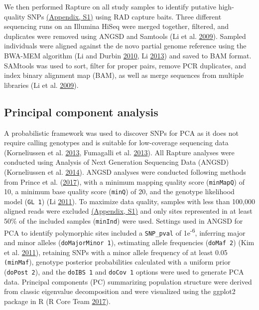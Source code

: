\documentclass[twoside,12pt,final]{ucthesis-CA2012} %
\begin{document}
\begin{ucmainmatter}
We then performed Rapture on all study samples to identify putative
high-quality SNPs \protect\hyperlink{supptables}{(Appendix, S1)} using
RAD capture baits. Three different sequencing runs on an Illumina HiSeq
were merged together, filtered, and duplicates were removed using ANGSD
and Samtools (Li et al. \protect\hyperlink{ref-li_sequence_2009}{2009}).
Sampled individuals were aligned against the de novo partial genome
reference using the BWA-MEM algorithm (Li and Durbin
\protect\hyperlink{ref-li_fast_2010}{2010}, Li
\protect\hyperlink{ref-li_aligning_2013}{2013}) and saved to BAM format.
SAMtools was used to sort, filter for proper pairs, remove PCR
duplicates, and index binary alignment map (BAM), as well as merge
sequences from multiple libraries (Li et al.
\protect\hyperlink{ref-li_sequence_2009}{2009}).

\hypertarget{principal-component-analysis}{%
\subsection{Principal component
analysis}\label{principal-component-analysis}}

A probabilistic framework was used to discover SNPs for PCA as it does
not require calling genotypes and is suitable for low-coverage
sequencing data (Korneliussen et al.
\protect\hyperlink{ref-korneliussen_calculation_2013}{2013}, Fumagalli
et al. \protect\hyperlink{ref-fumagalli_quantifying_2013}{2013}). All
Rapture analyses were conducted using Analysis of Next Generation
Sequencing Data (ANGSD) (Korneliussen et al.
\protect\hyperlink{ref-korneliussen_angsd_2014}{2014}). ANGSD analyses
were conducted following methods from Prince et al.
(\protect\hyperlink{ref-prince_evolutionary_2017}{2017}), with a minimum
mapping quality score (\texttt{minMapQ}) of 10, a minimum base quality
score (\texttt{minQ}) of 20, and the genotype likelihood model
(\texttt{GL\ 1}) (Li \protect\hyperlink{ref-li_statistical_2011}{2011}).
To maximize data quality, samples with less than 100,000 aligned reads
were excluded \protect\hyperlink{supptables}{(Appendix, S1)} and only
sites represented in at least 50\% of the included samples
(\texttt{minInd}) were used. Settings used in ANGSD for PCA to identify
polymorphic sites included a \texttt{SNP\_pval} of
1e\textsuperscript{-6}, inferring major and minor alleles
(\texttt{doMajorMinor\ 1}), estimating allele frequencies
(\texttt{doMaf\ 2}) (Kim et al.
\protect\hyperlink{ref-kim_estimation_2011}{2011}), retaining SNPs with
a minor allele frequency of at least 0.05 \texttt{(minMaf}), genotype
posterior probabilities calculated with a uniform prior
(\texttt{doPost\ 2}), and the \texttt{doIBS\ 1} and \texttt{doCov\ 1}
options were used to generate PCA data. Principal components (PC)
summarizing population structure were derived from classic eigenvalue
decomposition and were visualized using the ggplot2 package in R (R Core
Team \protect\hyperlink{ref-r_core_team_r_2017}{2017}).


\end{ucmainmatter}
\end{document}

